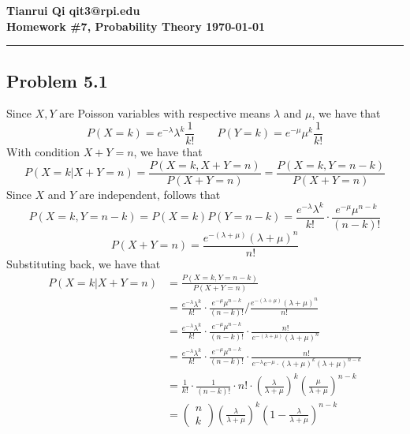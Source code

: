 \documentclass[12pt]{article}
\begin{document}
\newcommand{\D}{\displaystyle}
\newcommand{\vc}[1]{\,\mathbf{#1}}

{\bf \noindent Tianrui Qi  \hfill qit3@rpi.edu \\ Homework \#7, Probability Theory \hfill \today}\\ \hrule\bigskip



\subsection*{\bf Problem 5.1}
	
	Since $X, Y$ are Poisson variables with respective means $\lambda$ and $\mu$, we have that
	$$P\left( X=k\right)  =e^{-\lambda }\lambda^{k} \frac{1}{k!} \qquad P\left( Y=k\right)  =e^{-\mu }\mu^{k} \frac{1}{k!} $$
	With condition $X+Y = n$, we have that
	$$P\left( X=k|X+Y=n\right)  =\frac{P\left( X=k,X+Y=n\right)  }{P\left( X+Y=n\right)  } =\frac{P\left( X=k,Y=n-k\right)  }{P\left( X+Y=n\right)  } $$
	Since $X$ and $Y$ are independent, follows that 
	$$P\left( X=k,Y=n-k\right)  =P\left( X=k\right)  P\left( Y=n-k\right)  =\frac{e^{-\lambda }\lambda^{k} }{k!} \cdot \frac{e^{-\mu }\mu^{n-k} }{\left( n-k\right)  !}   $$
	$$P\left( X+Y=n\right)  =\frac{e^{-\left( \lambda +\mu \right)  }\left( \lambda +\mu \right)^{n}  }{n!}  $$
	Substituting back, we have that 
	$$\begin{aligned}
		P\left( X=k|X+Y=n\right) 
		&=\frac{P\left( X=k,Y=n-k\right)  }{P\left( X+Y=n\right)  } \\
		&=\frac{e^{-\lambda }\lambda^{k} }{k!} \cdot \frac{e^{-\mu }\mu^{n-k} }{\left( n-k\right)  !} /\frac{e^{-\left( \lambda +\mu \right)  }\left( \lambda +\mu \right)^{n}  }{n!} \\ 
		&=\frac{e^{-\lambda }\lambda^{k} }{k!} \cdot \frac{e^{-\mu }\mu^{n-k} }{\left( n-k\right)  !} \cdot \frac{n!}{e^{-\left( \lambda +\mu \right)  }\left( \lambda +\mu \right)^{n}  } \\ 
		&=\frac{e^{-\lambda }\lambda^{k} }{k!} \cdot \frac{e^{-\mu }\mu^{n-k} }{\left( n-k\right)  !} \cdot \frac{n!}{e^{-\lambda }e^{-\mu }\cdot \left( \lambda +\mu \right)^{k}  \left( \lambda +\mu \right)^{n-k}  } \\ 
		&=\frac{1}{k!} \cdot \frac{1}{\left( n-k\right)  !} \cdot n!\cdot \left( \frac{\lambda }{\lambda +\mu } \right)^{k}  \left( \frac{\mu }{\lambda +\mu } \right)^{n-k}  \\ 
		&=\begin{pmatrix}n\\ k\end{pmatrix} \left( \frac{\lambda }{\lambda +\mu } \right)^{k}  \left( 1-\frac{\lambda }{\lambda +\mu } \right)^{n-k}  
	\end{aligned} $$
\end{document}
